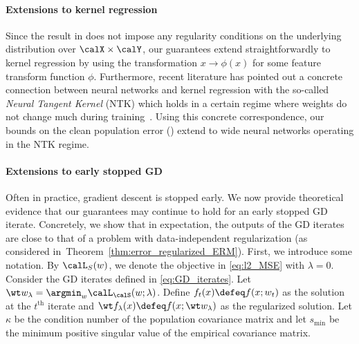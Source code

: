 \paragraph{Extensions to kernel regression}
% 
Since the result in  
does not impose any regularity conditions 
on the underlying distribution 
over $\calX\times \calY$, 
our guarantees %
extend straightforwardly to kernel regression 
by using the transformation $x\to \phi(x)$ 
for some feature transform function $\phi$. 
Furthermore, recent literature 
has pointed out a concrete connection 
between neural networks 
and kernel regression 
with the so-called 
\emph{Neural Tangent Kernel} (NTK) 
which holds in a certain regime
where weights do not change much 
during training~\citep{jacot2018neural,du2019gradient,du2018gradient,chizat2019lazy}. 
% 
Using this concrete correspondence, 
our bounds on the clean population error 
() 
extend to wide neural networks 
operating in the NTK regime.  %



\paragraph{Extensions to early stopped GD} 
Often in practice, gradient descent is stopped early. 
% 
We now provide theoretical evidence 
that our guarantees 
may continue to hold 
for an early stopped GD iterate. Concretely, we show that in expectation,
the outputs of the GD iterates are close 
to that of a problem with data-independent regularization (as considered in~Theorem~\ref{thm:error_regularized_ERM}).
% 
First,
we introduce some notation.  
By $\calL_{S}(w)$, we denote 
the objective in \eqref{eq:l2_MSE} with $\lambda=0$. 
Consider the GD iterates defined in \eqref{eq:GD_iterates}. 
Let $\wt w_{\lambda} = \argmin_{w} \calL_\calS (w;\lambda)$. 
% 
Define $f_t(x) \defeq f(x;w_t)$ as the solution at the $t^{\text{th}}$ iterate
and $\wt f_\lambda(x) \defeq f(x;\wt w_\lambda)$ as the regularized solution. 
Let $\kappa$ be the condition number of the population covariance matrix 
and let $s_\text{min}$ be the minimum positive singular value 
of the empirical covariance matrix. 
% 

